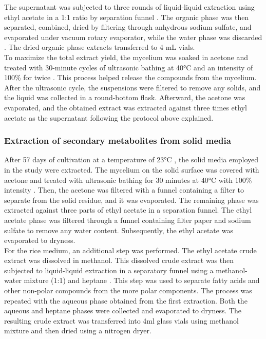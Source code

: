 The supernatant was subjected to three rounds of liquid-liquid extraction using ethyl acetate in a 1:1 ratio by separation funnel \cite{Harms2021}. The organic phase was then separated, combined, dried by filtering through anhydrous sodium sulfate, and evaporated under vacuum rotary evaporator, while the water phase was discarded \cite{Harms2021}. The dried organic phase extracts  transferred to 4 mL vials.\\

To maximize the total extract yield, the mycelium was soaked in acetone and treated with 30-minute cycles of ultrasonic bathing at 40°C and an intensity of 100\% for twice \cite{Harms2021}. This process helped release the compounds from the mycelium. After the ultrasonic cycle, the suspensions were filtered to remove any solids, and the liquid was collected in a round-bottom flask. Afterward, the acetone was evaporated, and the obtained extract was extracted against three times ethyl acetate as the supernatant following the protocol above explained. 

\subsubsection{Extraction of secondary metabolites from solid media} \label{extraction-solid-media}
After 57 days of cultivation at a temperature of 23°C , the solid media employed in the study were extracted. The mycelium on the solid surface was covered with acetone and treated with  ultrasonic bathing for 30 minutes at 40°C with 100\% intensity \cite{Harms2021}. Then, the acetone was filtered with a funnel containing a filter to separate from the solid residue, and it was evaporated. The remaining phase was extracted against three parts of ethyl acetate in a separation funnel. The ethyl acetate phase was filtered through a funnel containing filter paper and sodium sulfate to remove any water content. Subsequently, the ethyl acetate was evaporated to dryness.\\

For the rice medium, an additional step was performed. The ethyl acetate crude extract was dissolved in methanol. This dissolved crude extract was then subjected to liquid-liquid extraction in a separatory funnel using a methanol-water mixture (1:1) and heptane \cite{Harms2021}. This step was used to separate fatty acids and other non-polar compounds from the more polar components. The process was repeated with the aqueous phase obtained from the first extraction. Both the aqueous and heptane phases were collected and evaporated to dryness. The resulting crude extract was transferred into 4ml glass vials using methanol mixture and then dried using a nitrogen dryer.





